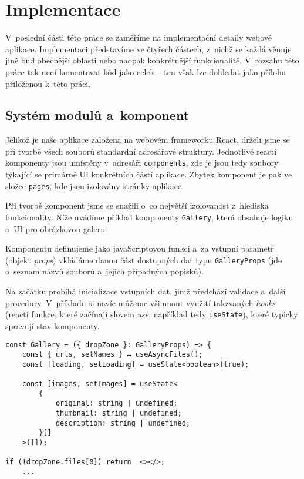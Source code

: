 \hypertarget{implementace}{%
\chapter{Implementace}\label{implementace}}

V~poslední části této práce se zaměříme na implementační detaily webové aplikace. Implementaci představíme ve čtyřech částech, z~nichž se každá věnuje jiné buď obecnější oblasti nebo naopak konkrétnější funkcionalitě. V~rozsahu této práce tak není komentovat kód jako celek -- ten však lze dohledat jako přílohu přiloženou k~této práci.

\hypertarget{systuxe9m-modulux16f-a-komponent}{%
\section{Systém modulů a~komponent}\label{systuxe9m-modulux16f-a-komponent}}

Jelikož je naše aplikace založena na webovém frameworku React, drželi jsme se při tvorbě všech souborů standardní adresářové struktury. Jednotlivé reactí komponenty jsou umístěny v~adresáři \verb|components|, zde je jsou tedy soubory týkající se primárně UI konkrétních částí aplikace. Zbytek komponent je pak ve složce \verb|pages|, kde jsou izolovány stránky aplikace.


Při tvorbě komponent jsme se snažili o~co největší izolovanost z~hlediska funkcionality. Níže uvádíme příklad komponenty \verb|Gallery|, která obsahuje logiku a~UI pro obrázkovou galerii.

Komponentu definujeme jako javaScriptovou funkci a~za vstupní parametr (objekt \emph{props}) vkládáme danou část dostupných dat typu \verb|GalleryProps| (jde o~seznam názvů souborů a~jejich případných popisků).

Na začátku probíhá inicializace vstupních dat, jimž předchází validace a~další procedury. V~příkladu si navíc můžeme všimnout využití takzvaných \emph{hooks} (reactí funkce, které začínají slovem \emph{use}, například tedy \verb|useState|), které typicky spravují stav komponenty.

\begin{verbatim}
const Gallery = ({ dropZone }: GalleryProps) => {
    const { urls, setNames } = useAsyncFiles();
    const [loading, setLoading] = useState<boolean>(true);
    
    const [images, setImages] = useState<
        {
            original: string | undefined;
            thumbnail: string | undefined;
            description: string | undefined;
        }[]
    >([]);
    
if (!dropZone.files[0]) return  <></>;
    ...
\end{verbatim}

